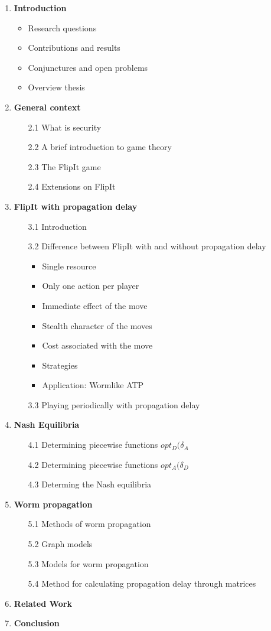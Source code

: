 \documentclass[a4paper, 11pt]{article}
\begin{document}
\begin{enumerate}
\item \textbf{Introduction} 
\begin{itemize}
\item Research questions
\item Contributions and results
\item Conjunctures and open problems
\item Overview thesis
\end{itemize}
\item \textbf{General context}
\begin{itemize}
\item[2.1] What is security
\item[2.2] A brief introduction to game theory
\item[2.3] The FlipIt game
\item[2.4] Extensions on FlipIt
\end{itemize}
\item \textbf{FlipIt with propagation delay}
\begin{itemize}
\item[3.1] Introduction
\item[3.2] Difference between FlipIt with and without propagation delay
\begin{itemize}
\item Single resource
\item Only one action per player
\item Immediate effect of the move
\item Stealth character of the moves
\item Cost associated with the move
\item Strategies
\item Application: Wormlike ATP
\end{itemize}
\item[3.3] Playing periodically with propagation delay
\end{itemize}
\item \textbf{Nash Equilibria}
\begin{itemize}
\item[4.1] Determining piecewise functions $opt_{D}(\delta_{A}$
\item[4.2] Determining piecewise functions $opt_{A}(\delta_{D}$
\item[4.3] Determing the Nash equilibria
\end{itemize}
\item\textbf{ Worm propagation}
\begin{itemize}
\item[5.1] Methods of worm propagation
\item[5.2] Graph models
\item[5.3] Models for worm propagation
\item[5.4] Method for calculating propagation delay through matrices
\end{itemize}
\item \textbf{Related Work}
\item \textbf{Conclusion}
\end{enumerate}
\end{document}
